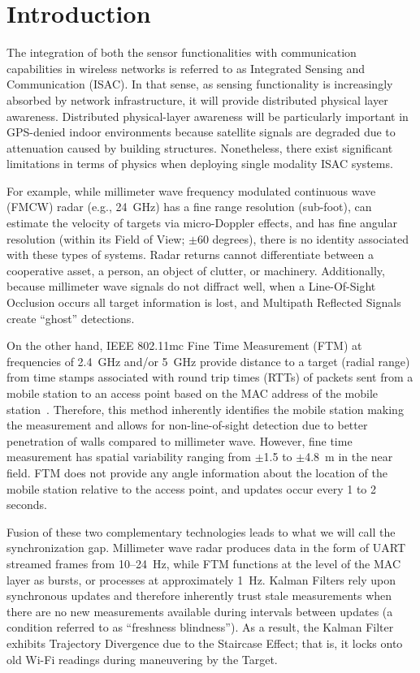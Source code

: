 \chapter{Introduction}
\label{chap:intro}

The integration of both the sensor functionalities with communication capabilities in wireless networks is referred to as Integrated Sensing and Communication (ISAC). In that sense, as sensing functionality is increasingly absorbed by network infrastructure, it will provide distributed physical layer awareness. Distributed physical-layer awareness will be particularly important in GPS-denied indoor environments because satellite signals are degraded due to attenuation caused by building structures. Nonetheless, there exist significant limitations in terms of physics when deploying single modality ISAC systems.

For example, while millimeter wave frequency modulated continuous wave (FMCW) radar (e.g., 24~GHz) has a fine range resolution (sub-foot), can estimate the velocity of targets via micro-Doppler effects, and has fine angular resolution (within its Field of View; $\pm$60 degrees), there is no identity associated with these types of systems. Radar returns cannot differentiate between a cooperative asset, a person, an object of clutter, or machinery. Additionally, because millimeter wave signals do not diffract well, when a Line-Of-Sight Occlusion occurs all target information is lost, and Multipath Reflected Signals create ``ghost'' detections.

On the other hand, IEEE 802.11mc Fine Time Measurement (FTM) at frequencies of 2.4~GHz and/or 5~GHz provide distance to a target (radial range) from time stamps associated with round trip times (RTTs) of packets sent from a mobile station to an access point based on the MAC address of the mobile station~\cite{aggarwal_wifi}. Therefore, this method inherently identifies the mobile station making the measurement and allows for non-line-of-sight detection due to better penetration of walls compared to millimeter wave. However, fine time measurement has spatial variability ranging from $\pm$1.5 to $\pm$4.8~m in the near field. FTM does not provide any angle information about the location of the mobile station relative to the access point, and updates occur every 1 to 2 seconds.

Fusion of these two complementary technologies leads to what we will call the synchronization gap. Millimeter wave radar produces data in the form of UART streamed frames from 10--24~Hz, while FTM functions at the level of the MAC layer as bursts, or processes at approximately 1~Hz. Kalman Filters rely upon synchronous updates and therefore inherently trust stale measurements when there are no new measurements available during intervals between updates (a condition referred to as ``freshness blindness''). As a result, the Kalman Filter exhibits Trajectory Divergence due to the Staircase Effect; that is, it locks onto old Wi-Fi readings during maneuvering by the Target.

